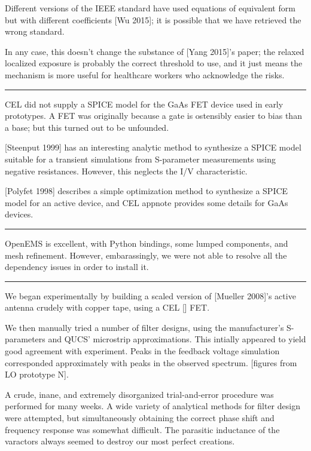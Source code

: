 \documentclass[fleqn,10pt]{article}
\begin{document}
Different versions of the IEEE standard have used equations of equivalent form but with different coefficients [Wu 2015]; it is possible that we have retrieved the wrong standard.

In any case, this doesn't change the substance of [Yang 2015]'s paper; the relaxed localized exposure is probably the correct threshold to use, and it just means the mechanism is more useful for healthcare workers who acknowledge the risks.

\rule{\linewidth}{0.2pt}

CEL did not supply a SPICE model for the GaAs FET device used in early prototypes. A FET was originally because a gate is ostensibly easier to bias than a base; but this turned out to be unfounded.

[Steenput 1999] has an interesting analytic method to synthesize a SPICE model suitable for a transient simulations from S-parameter measurements using negative resistances. However, this neglects the I/V characteristic. 

[Polyfet 1998] describes a simple optimization method to synthesize a SPICE model for an active device, and CEL appnote provides some details for GaAs devices.



\rule{\linewidth}{0.2pt}

OpenEMS is excellent, with Python bindings, some lumped components, and mesh refinement. However, embarassingly, we were not able to resolve all the dependency issues in order to install it.

\rule{\linewidth}{0.2pt}

We began experimentally by building a scaled version of [Mueller 2008]'s active antenna crudely with copper tape, using a CEL [] FET.



We then manually tried a number of filter designs, using the manufacturer's S-parameters and QUCS' microstrip approximations. This intially appeared to yield good agreement with experiment. Peaks in the feedback voltage simulation corresponded approximately with peaks in the observed spectrum. [figures from LO prototype N]. 

A crude, inane, and extremely disorganized trial-and-error procedure was performed for many weeks. A wide variety of analytical methods for filter design were attempted, but simultaneously obtaining the correct phase shift and frequency response was somewhat difficult. The parasitic inductance of the varactors always seemed to destroy our most perfect creations.
\end{document}
